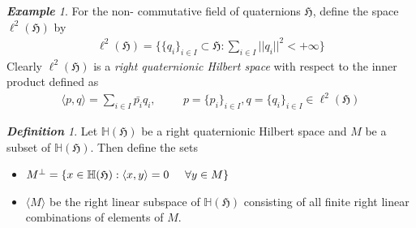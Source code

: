 \documentclass[a4paper,12pt,reqno]{amsart}
\theoremstyle{plain}
\theoremstyle{remark}
\newtheorem{definition}[theorem]{\bf Definition}
\newtheorem{example}[theorem]{\bf Example}
\begin{document}
	\begin{example}\cite{o}
		For the non- commutative field of quaternions $\mathfrak{H}$, define the space $\ell^2(\mathfrak{H})$ by 
		\begin{align*}
			\ell^2(\mathfrak{H})= \Bigg\{ \{q_i \}_{i\in I} \subset \mathfrak{H} : \sum_{i\in I} ||q_i||^2 < + \infty \Bigg \}
		\end{align*}
		Clearly $\ell^2(\mathfrak{H})$ is a \textit{right quaternionic Hilbert space} with respect to the inner product defined as 
		\begin{align*}
			\langle p, q \rangle = \sum_{i\in I} \bar{p_i} q_i , \hspace{1cm} p=\{p_i\}_{i\in I}, q=\{q_i\}_{i\in I} \in \ell^2(\mathfrak{H})
		\end{align*}
	\end{example}
	\begin{definition}\cite{o}
		Let $\mathbb{H}(\mathfrak{H})$ be a right quaternionic Hilbert space and $M$ be a subset of $\mathbb{H}(\mathfrak{H})$. Then define the sets 
		\begin{itemize}
			\item $M^{\perp}=\{x\in \mathbb{H}(\mathfrak{H}) : \langle x, y \rangle =0 \hspace{0.5cm} \forall y \in M\}$
			\item $\langle M \rangle$ be the right linear subspace of $\mathbb{H}(\mathfrak{H})$  consisting of all finite right linear combinations of elements of $M$.
		\end{itemize}
		
		
	\end{definition}
	
\end{document}
